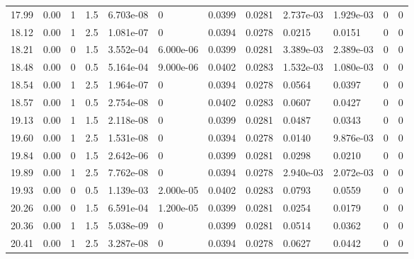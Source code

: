 \documentclass[preview]{standalone}
\begin{document}
{{{\begin{tabular}{L{1.2cm}C{1.2cm} C{0.3cm}C{0.5cm} C{1.4cm}C{1.4cm} C{1.4cm}C{1.4cm} C{1.6cm}C{1.6cm} C{1.6cm}C{1.6cm}}
  17.99  &  0.00  & 1     & 1.5 &  6.703e-08  & 0  &  0.0399&   0.0281& 2.737e-03 & 1.929e-03   &  0 & 0  \\ 
  18.12  &  0.00  & 1     & 2.5 &  1.081e-07  & 0  &  0.0394&   0.0278& 0.0215 & 0.0151   &  0 & 0  \\ 
  18.21  &  0.00  & 0     & 1.5 &  3.552e-04  & 6.000e-06  &  0.0399&   0.0281& 3.389e-03 & 2.389e-03   &  0 & 0  \\ 
  18.48  &  0.00  & 0     & 0.5 &  5.164e-04  & 9.000e-06  &  0.0402&   0.0283& 1.532e-03 & 1.080e-03   &  0 & 0  \\ 
  18.54  &  0.00  & 1     & 2.5 &  1.964e-07  & 0  &  0.0394&   0.0278& 0.0564 & 0.0397   &  0 & 0  \\ 
  18.57  &  0.00  & 1     & 0.5 &  2.754e-08  & 0  &  0.0402&   0.0283& 0.0607 & 0.0427   &  0 & 0  \\ 
  19.13  &  0.00  & 1     & 1.5 &  2.118e-08  & 0  &  0.0399&   0.0281& 0.0487 & 0.0343   &  0 & 0  \\ 
  19.60  &  0.00  & 1     & 2.5 &  1.531e-08  & 0  &  0.0394&   0.0278& 0.0140 & 9.876e-03   &  0 & 0  \\ 
  19.84  &  0.00  & 0     & 1.5 &  2.642e-06  & 0  &  0.0399&   0.0281& 0.0298 & 0.0210   &  0 & 0  \\ 
  19.89  &  0.00  & 1     & 2.5 &  7.762e-08  & 0  &  0.0394&   0.0278& 2.940e-03 & 2.072e-03   &  0 & 0  \\ 
  19.93  &  0.00  & 0     & 0.5 &  1.139e-03  & 2.000e-05  &  0.0402&   0.0283& 0.0793 & 0.0559   &  0 & 0  \\ 
  20.26  &  0.00  & 0     & 1.5 &  6.591e-04  & 1.200e-05  &  0.0399&   0.0281& 0.0254 & 0.0179   &  0 & 0  \\ 
  20.36  &  0.00  & 1     & 1.5 &  5.038e-09  & 0  &  0.0399&   0.0281& 0.0514 & 0.0362   &  0 & 0  \\ 
  20.41  &  0.00  & 1     & 2.5 &  3.287e-08  & 0  &  0.0394&   0.0278& 0.0627 & 0.0442   &  0 & 0  \\ 
\hline 
\end{tabular} 

}}}
\end{document}
